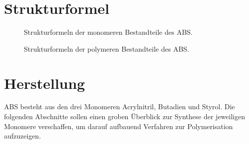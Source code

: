     \section{Strukturformel}
        \begin{figure}[H]%
            \centering
            \qquad
            \qquad
            \caption[Strukturformeln der monomeren Bestandteile des ABS]{Strukturformeln der monomeren Bestandteile des ABS.}%
            \label{fig:strukturformeln monomere}%
        \end{figure}
        \begin{figure}[H]%
            \centering
            \qquad
            \qquad
            \caption[Strukturformeln der polymeren Bestandteile des ABS]{Strukturformeln der polymeren Bestandteile des ABS.}%
            \label{fig:strukturformeln polymere}%
        \end{figure}
    \section{Herstellung}
        ABS besteht aus den drei Monomeren Acrylnitril, Butadien und Styrol. Die folgenden Abschnitte sollen einen groben
        Überblick zur Synthese der jeweiligen Monomere verschaffen, um darauf aufbauend Verfahren zur Polymerisation aufzuzeigen.
        
